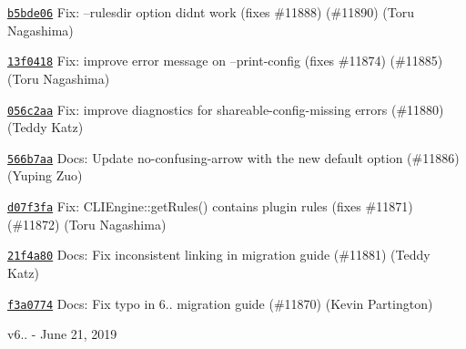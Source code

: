 \begin{DoxyItemize}
\item \href{https://github.com/eslint/eslint/commit/b5bde0669bd6a7a6b8e38cdf204d8d4b932cea63}{\texttt{ {\ttfamily b5bde06}}} Fix\+: --rulesdir option didn\textquotesingle{}t work (fixes \#11888) (\#11890) (Toru Nagashima)
\item \href{https://github.com/eslint/eslint/commit/13f041897ee31982808a57b4d06450b57c9b27dc}{\texttt{ {\ttfamily 13f0418}}} Fix\+: improve error message on --print-\/config (fixes \#11874) (\#11885) (Toru Nagashima)
\item \href{https://github.com/eslint/eslint/commit/056c2aaf39a5f8d06de24f06946dda95032a0361}{\texttt{ {\ttfamily 056c2aa}}} Fix\+: improve diagnostics for shareable-\/config-\/missing errors (\#11880) (Teddy Katz)
\item \href{https://github.com/eslint/eslint/commit/566b7aa5d61fb31cd47fe4da7820b07cf9bde1ec}{\texttt{ {\ttfamily 566b7aa}}} Docs\+: Update no-\/confusing-\/arrow with the new default option (\#11886) (Yuping Zuo)
\item \href{https://github.com/eslint/eslint/commit/d07f3fae19b901c30cf4998f10722cb3182bd237}{\texttt{ {\ttfamily d07f3fa}}} Fix\+: C\+L\+I\+Engine\+::get\+Rules() contains plugin rules (fixes \#11871) (\#11872) (Toru Nagashima)
\item \href{https://github.com/eslint/eslint/commit/21f4a8057ccc941f72bb617ae3b5c135a774f6c0}{\texttt{ {\ttfamily 21f4a80}}} Docs\+: Fix inconsistent linking in migration guide (\#11881) (Teddy Katz)
\item \href{https://github.com/eslint/eslint/commit/f3a0774a8879b08777a4aedc76677f13d5156242}{\texttt{ {\ttfamily f3a0774}}} Docs\+: Fix typo in 6.. migration guide (\#11870) (Kevin Partington)
\end{DoxyItemize}

v6.. -\/ June 21, 2019



